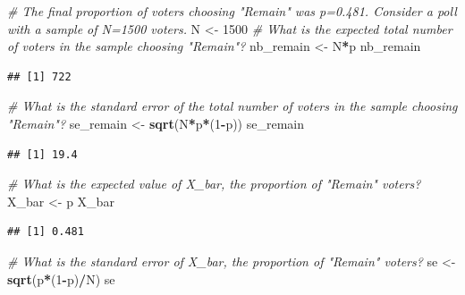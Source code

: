 \documentclass[
]{article}
\newenvironment{Shaded}{\begin{snugshade}}{\end{snugshade}}
\newcommand{\CommentTok}[1]{\textcolor[rgb]{0.56,0.35,0.01}{\textit{#1}}}
\newcommand{\DecValTok}[1]{\textcolor[rgb]{0.00,0.00,0.81}{#1}}
\newcommand{\KeywordTok}[1]{\textcolor[rgb]{0.13,0.29,0.53}{\textbf{#1}}}
\newcommand{\NormalTok}[1]{#1}
\newcommand{\OperatorTok}[1]{\textcolor[rgb]{0.81,0.36,0.00}{\textbf{#1}}}
\newcommand{\StringTok}[1]{\textcolor[rgb]{0.31,0.60,0.02}{#1}}
\begin{document}
\begin{Shaded}
\begin{Highlighting}[]
\CommentTok{\# The final proportion of voters choosing "Remain" was p=0.481. Consider a poll with a sample of N=1500 voters.}
\NormalTok{N \textless{}{-}}\StringTok{ }\DecValTok{1500}
\CommentTok{\# What is the expected total number of voters in the sample choosing "Remain"?}
\NormalTok{nb\_remain \textless{}{-}}\StringTok{ }\NormalTok{N}\OperatorTok{*}\NormalTok{p}
\NormalTok{nb\_remain}
\end{Highlighting}
\end{Shaded}

\begin{verbatim}
## [1] 722
\end{verbatim}

\begin{Shaded}
\begin{Highlighting}[]
\CommentTok{\# What is the standard error of the total number of voters in the sample choosing "Remain"?}
\NormalTok{se\_remain \textless{}{-}}\StringTok{ }\KeywordTok{sqrt}\NormalTok{(N}\OperatorTok{*}\NormalTok{p}\OperatorTok{*}\NormalTok{(}\DecValTok{1}\OperatorTok{{-}}\NormalTok{p))}
\NormalTok{se\_remain}
\end{Highlighting}
\end{Shaded}

\begin{verbatim}
## [1] 19.4
\end{verbatim}

\begin{Shaded}
\begin{Highlighting}[]
\CommentTok{\# What is the expected value of X\_bar, the proportion of "Remain" voters?}
\NormalTok{X\_bar \textless{}{-}}\StringTok{ }\NormalTok{p}
\NormalTok{X\_bar}
\end{Highlighting}
\end{Shaded}

\begin{verbatim}
## [1] 0.481
\end{verbatim}

\begin{Shaded}
\begin{Highlighting}[]
\CommentTok{\# What is the standard error of X\_bar, the proportion of "Remain" voters?}
\NormalTok{se \textless{}{-}}\StringTok{ }\KeywordTok{sqrt}\NormalTok{(p}\OperatorTok{*}\NormalTok{(}\DecValTok{1}\OperatorTok{{-}}\NormalTok{p)}\OperatorTok{/}\NormalTok{N)}
\NormalTok{se}
\end{Highlighting}
\end{Shaded}
\end{document}
